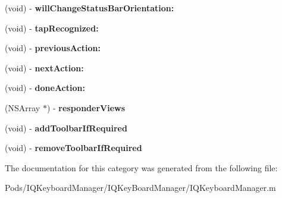 \begin{DoxyCompactItemize}
(void) -\/ {\bfseries will\+Change\+Status\+Bar\+Orientation\+:}
\item 
\mbox{\label{category_i_q_keyboard_manager_07_08_ace1f1baa94ce96d94334fbf26d50da02}} 
(void) -\/ {\bfseries tap\+Recognized\+:}
\item 
\mbox{\label{category_i_q_keyboard_manager_07_08_aaef3ba35aa1e5702e6f68dd4c9199901}} 
(void) -\/ {\bfseries previous\+Action\+:}
\item 
\mbox{\label{category_i_q_keyboard_manager_07_08_aa905a6d9dc11d75d3cf76e56d6515cc3}} 
(void) -\/ {\bfseries next\+Action\+:}
\item 
\mbox{\label{category_i_q_keyboard_manager_07_08_abeb588ff5524d5d0bc9ca1dd10c54cc3}} 
(void) -\/ {\bfseries done\+Action\+:}
\item 
\mbox{\label{category_i_q_keyboard_manager_07_08_a7a1c830ac0d2bf39b2c535cac0f75606}} 
(N\+S\+Array $\ast$) -\/ {\bfseries responder\+Views}
\item 
\mbox{\label{category_i_q_keyboard_manager_07_08_a332b8e799609d12238122d4df1d2bee8}} 
(void) -\/ {\bfseries add\+Toolbar\+If\+Required}
\item 
\mbox{\label{category_i_q_keyboard_manager_07_08_af8e024e777ee09d9b81085a6ee1f1d27}} 
(void) -\/ {\bfseries remove\+Toolbar\+If\+Required}
\end{DoxyCompactItemize}


The documentation for this category was generated from the following file\+:\begin{DoxyCompactItemize}
\item 
Pods/\+I\+Q\+Keyboard\+Manager/\+I\+Q\+Key\+Board\+Manager/I\+Q\+Keyboard\+Manager.\+m\end{DoxyCompactItemize}
